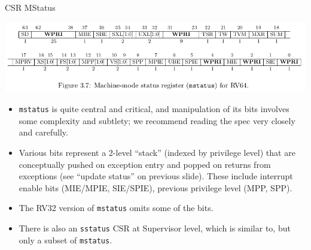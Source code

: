 \documentclass{article}
\begin{document}
\clearpage


\begin{center}
  {\Huge
    CSR MStatus}

  \vspace*{0.3in}

  \begin{minipage}{9.5in}\Large
    \begin{center}
      \includegraphics[width=8in]{Figs/CSR_RV64_MStatus.png}
    \end{center}

    \vspace*{0.3in}

    \begin{itemize}
    \item {\tt mstatus} is quite central and critical, and
      manipulation of its bits involves some complexity and subtlety;
      we recommend reading the spec very closely and carefully.

    \item Various bits represent a 2-level ``stack'' (indexed by
      privilege level) that are conceptually pushed on exception entry
      and popped on returns from exceptions (see ``update status'' on
      previous slide).  These include interrupt enable bits (MIE/MPIE,
      SIE/SPIE), previous privilege level (MPP, SPP).

    \item The RV32 version of {\tt mstatus} omits some of the bits.

    \item There is also an {\tt sstatus} CSR at Supervisor level,
      which is similar to, but only a subset of {\tt mstatus}.
    \end{itemize}
  \end{minipage}

\end{center}

\clearpage

\end{document}
